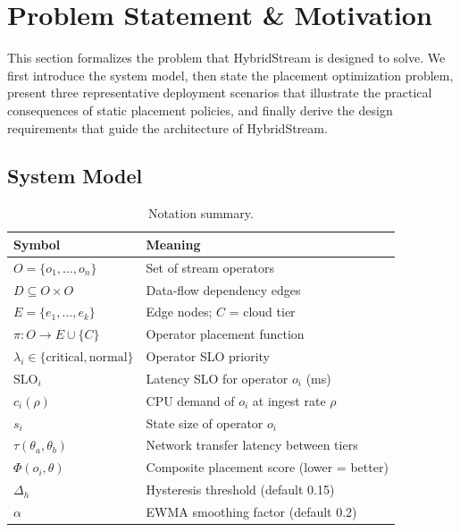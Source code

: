 \documentclass[preprint,review,12pt]{elsarticle}
\begin{document}
\section{Problem Statement \& Motivation}\label{problem-statement-motivation}

This section formalizes the problem that HybridStream is designed to solve. We first introduce the system model, then state the placement optimization problem, present three representative deployment scenarios that illustrate the practical consequences of static placement policies, and finally derive the design requirements that guide the architecture of HybridStream.

\subsection{System Model}

\begin{table}[htbp]
\centering
\caption{Notation summary.}
\label{tab:notation}
\begin{tabular}{@{}ll@{}}
\toprule
Symbol & Meaning \\
\midrule
$O = \{o_1, \ldots, o_n\}$ & Set of stream operators \\
$D \subseteq O \times O$ & Data-flow dependency edges \\
$E = \{e_1, \ldots, e_k\}$ & Edge nodes; $C$ = cloud tier \\
$\pi: O \to E \cup \{C\}$ & Operator placement function \\
$\lambda_i \in \{\text{critical}, \text{normal}\}$ & Operator SLO priority \\
$\text{SLO}_i$ & Latency SLO for operator $o_i$ (ms) \\
$c_i(\rho)$ & CPU demand of $o_i$ at ingest rate $\rho$ \\
$s_i$ & State size of operator $o_i$ \\
$\tau(\theta_a, \theta_b)$ & Network transfer latency between tiers \\
$\Phi(o_i, \theta)$ & Composite placement score (lower = better) \\
$\Delta_h$ & Hysteresis threshold (default 0.15) \\
$\alpha$ & EWMA smoothing factor (default 0.2) \\
\bottomrule
\end{tabular}
\end{table}
\label{system-model}
\end{document}
